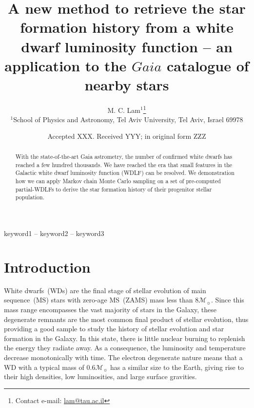 \documentclass[fleqn,usenatbib]{mnras}
\title[Galactic SFH from Gaia GCNS WDLF]{A new method to retrieve the star formation history from a white dwarf luminosity function -- an application to the $Gaia$ catalogue of nearby stars}
\author[M. C. Lam et al.]{
M. C. Lam$^{1}$\thanks{Contact e-mail: \href{mailto:lam@mail.tau.ac.il}{lam@tau.ac.il}}
\\
$^{1}$School of Physics and Astronomy, Tel Aviv University, Tel Aviv, Israel 69978
}
\date{Accepted XXX. Received YYY; in original form ZZZ}
\newcommand{\msun}{\mathcal{M}_{\sun}}
\begin{document}
\label{firstpage}
\pagerange{\pageref{firstpage}--\pageref{lastpage}}
\maketitle


\begin{abstract}
With the state-of-the-art Gaia astrometry, the number of confirmed white dwarfs
has reached a few hundred thousands. We have reached the era that small features
in the Galactic white dwarf luminosity function (WDLF) can be resolved. We
demonstration how we can apply Markov chain Monte Carlo sampling on a set of
pre-computed partial-WDLFs to derive the star formation history of their progenitor
stellar population.

\end{abstract}

\begin{keywords}
keyword1 -- keyword2 -- keyword3
\end{keywords}



\section{Introduction}
White dwarfs~(WDs) are the final stage of stellar evolution of main
sequence~(MS) stars with zero-age MS~(ZAMS) mass less than $8\msun$. Since this
mass range encompasses the vast majority of stars in the Galaxy, these
degenerate remnants are the most common final product of stellar evolution,
thus providing a good sample to study the history of stellar evolution and star
formation in the Galaxy. In this state, there is little nuclear burning to
replenish the energy they radiate away. As a consequence, the luminosity and
temperature decrease monotonically with time. The electron degenerate nature
means that a WD with a typical mass of $0.6\mathcal{M}_{\sun}$ has a similar
size to the Earth, giving rise to their high densities, low luminosities, and
large surface gravities.
\end{document}
